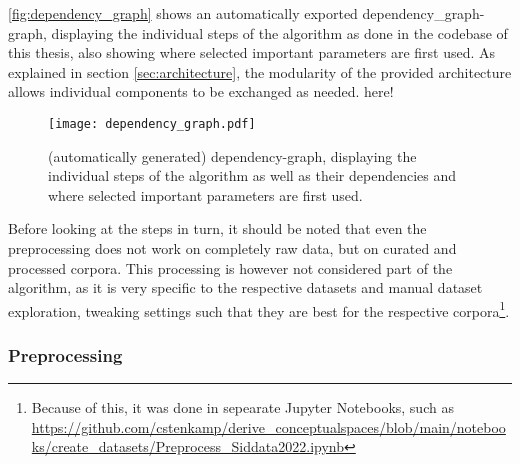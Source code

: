 
\autoref{fig:dependency_graph} shows an automatically exported dependency_graph-graph, displaying the individual steps of the algorithm as done in the codebase of this thesis, also showing where selected important parameters are first used. As explained in section \ref{sec:architecture}, the modularity of the provided architecture allows individual components to be exchanged as needed.
  here!


\begin{figure}[htp]
	\begin{center}
	  \texttt{[image: dependency\_graph.pdf]}
	  \caption[Dependency-Graph of the Algorithm]{(automatically generated) dependency-graph, displaying the individual steps of the algorithm as well as their dependencies and where selected important parameters are first used.}
	  \label{fig:dependency_graph}
	\end{center}
\end{figure}




Before looking at the steps in turn, it should be noted that even the preprocessing does not work on completely raw data, but on curated and processed corpora. This processing is however not considered part of the algorithm, as it is very specific to the respective datasets and manual dataset exploration, tweaking settings such that they are best for the respective corpora\footnote{Because of this, it was done in sepearate Jupyter Notebooks, such as \url{https://github.com/cstenkamp/derive_conceptualspaces/blob/main/notebooks/create_datasets/Preprocess_Siddata2022.ipynb} }. %


\subsubsection{Preprocessing}

\label{sec:algo_preproc}

